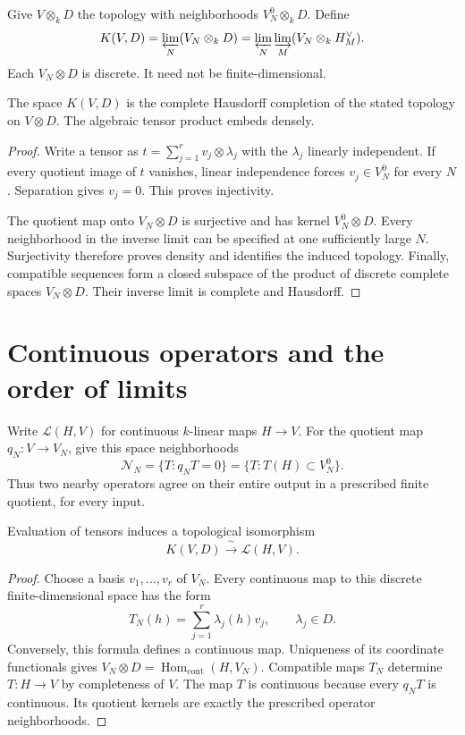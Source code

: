 Give $V\otimes_kD$ the topology with neighborhoods $V_N^0\otimes_kD$.
Define
\begin{equation}
 K(V,D)=\varprojlim_N(V_N\otimes_kD)
       =\varprojlim_N\varinjlim_M(V_N\otimes_kH_M^\vee).
 \label{eq:op-completion}
\end{equation}
Each $V_N\otimes D$ is discrete. It need not be finite-dimensional.

\begin{proposition}
The space $K(V,D)$ is the complete Hausdorff completion of the stated
topology on $V\otimes D$. The algebraic tensor product embeds densely.
\end{proposition}
\begin{proof}
Write a tensor as $t=\sum_{j=1}^r v_j\otimes\lambda_j$ with the
$\lambda_j$ linearly independent. If every quotient image of $t$
vanishes, linear independence forces $v_j\in V_N^0$ for every $N$.
Separation gives $v_j=0$. This proves injectivity.

The quotient map onto $V_N\otimes D$ is surjective and has kernel
$V_N^0\otimes D$. Every neighborhood in the inverse limit can be
specified at one sufficiently large $N$. Surjectivity therefore proves
density and identifies the induced topology. Finally, compatible
sequences form a closed subspace of the product of discrete complete
spaces $V_N\otimes D$. Their inverse limit is complete and Hausdorff.
\end{proof}

\section{Continuous operators and the order of limits}

Write $\mathcal L(H,V)$ for continuous $k$-linear maps $H\to V$.
For the quotient map $q_N:V\to V_N$, give this space neighborhoods
\[
 \mathcal N_N=\{T:q_NT=0\}
             =\{T:T(H)\subset V_N^0\}.
\]
Thus two nearby operators agree on their entire output in a prescribed
finite quotient, for every input.

\begin{proposition}
Evaluation of tensors induces a topological isomorphism
\begin{equation}
 K(V,D)\xrightarrow{\ \sim\ }\mathcal L(H,V).
 \label{eq:op-hom}
\end{equation}
\end{proposition}
\begin{proof}
Choose a basis $v_1,\ldots,v_r$ of $V_N$. Every continuous map to
this discrete finite-dimensional space has the form
\[
 T_N(h)=\sum_{j=1}^r\lambda_j(h)v_j,
 \qquad \lambda_j\in D.
\]
Conversely, this formula defines a continuous map. Uniqueness of its
coordinate functionals gives
$V_N\otimes D=\operatorname{Hom}_{\mathrm{cont}}(H,V_N)$.
Compatible maps $T_N$ determine $T:H\to V$ by completeness of $V$.
The map $T$ is continuous because every $q_NT$ is continuous.
Its quotient kernels are exactly the prescribed operator neighborhoods.
\end{proof}

